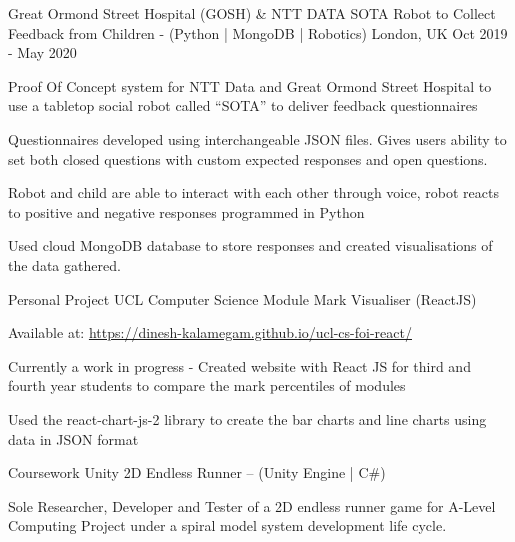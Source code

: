 
\begin{cventries}
  \cventry
    {Great Ormond Street Hospital (GOSH) \& NTT DATA} %
    {SOTA Robot to Collect Feedback from Children - (Python | MongoDB | Robotics)} %
    {London, UK} %
    {Oct 2019 - May 2020} %
    {
      \begin{cvitems} %
        \item {Proof Of Concept system for NTT Data and Great Ormond Street Hospital to use a tabletop social robot called ``SOTA'' to deliver feedback questionnaires}
        \item Questionnaires developed using interchangeable JSON files. Gives users ability to set both closed questions with custom expected responses and open questions. 
        \item{Robot and child are able to interact with each other through voice, robot reacts to positive and negative responses programmed in Python}
        \item{Used cloud MongoDB database to store responses and created visualisations of the data gathered.}
      \end{cvitems}
    }

  \cventry
  {Personal Project}
  {UCL Computer Science Module Mark Visualiser (ReactJS)}
  {}
  {}
  {
    \begin{cvitems}
      \item Available at: \href{https://dinesh-kalamegam.github.io/ucl-cs-foi-react/}{https://dinesh-kalamegam.github.io/ucl-cs-foi-react/}
      \item Currently a work in progress - Created website with React JS for third and fourth year students to compare the mark percentiles of modules
      \item Used the react-chart-js-2 library to create the bar charts and line charts using data in JSON format
    \end{cvitems}
  }

  \cventry
    {Coursework}
    {Unity 2D Endless Runner – (Unity Engine | C\#)}
    {}
    {}
    {
      \begin{cvitems}
        \item Sole Researcher, Developer and Tester of a 2D endless runner game for A-Level Computing Project under a spiral model system development life cycle.
      \end{cvitems}
    }

\end{cventries}
